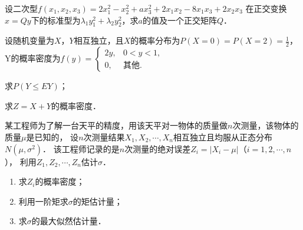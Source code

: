 \documentclass[plain,noanswer,medmath]{../../template/jnuexam}
\begin{document}
\begin{problem}[points=11]
设二次型$f(x_1,x_2,x_3) = 2x_1^2 - x_2^2 + ax_3^2 + 2x_1x_2 - 8x_1x_3 + 2x_2x_3$
在正交变换$x = Qy$下的标准型为$\lambda_1 y_1^2 + \lambda_2 y_2^2$，求$a$的值及一个正交矩阵$Q$．
\end{problem}


\begin{problem}[points=11]
设随机变量为$X$，$Y$相互独立，且$X$的概率分布为$P(X = 0) = P(X = 2) = \frac{1}{2}$，
Y的概率密度为$f(y) = \begin{cases}
  2y, & 0 < y < 1, \\
   0, & \text{其他}.
\end{cases}$\par
\begin{enumerate*}
\item 求$P(Y \le EY)$；
\item 求$Z = X + Y$的概率密度．
\end{enumerate*}
\end{problem}


\begin{problem}[points=11]
某工程师为了解一台天平的精度，用该天平对一物体的质量做$n$次测量，该物体的质量$\mu$是已知的，
设$n$次测量结果$X_1,X_2, \cdots ,X_n$相互独立且均服从正态分布$N(\mu ,\sigma^2)$．
该工程师记录的是$n$次测量的绝对误差$Z_i = |X_i-\mu|$（$i = 1,2, \cdots,n$），
利用$Z_1,Z_2, \cdots ,Z_n$估计$\sigma$．
\begin{enumerate}
\item 求$Z_i$的概率密度；
\item 利用一阶矩求$\sigma$的矩估计量；
\item 求$\sigma$的最大似然估计量．
\end{enumerate}
\end{problem}
\end{document}
